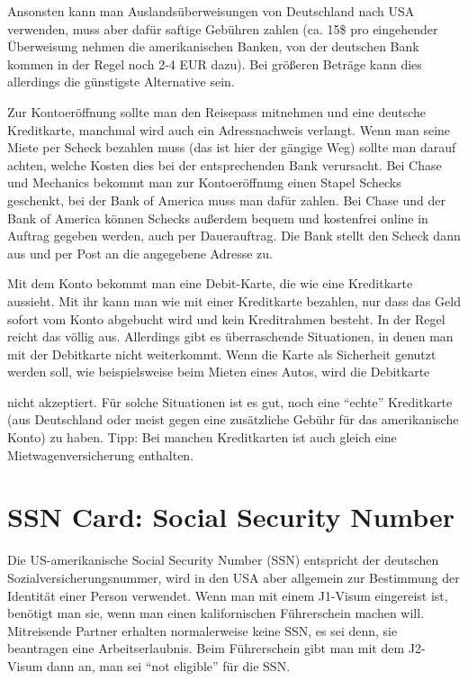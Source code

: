 \documentclass[a4paper]{scrreprt}
\begin{document}
Ansonsten kann man Auslandsüberweisungen von Deutschland nach USA verwenden, muss aber dafür saftige Gebühren zahlen (ca. 15\$ pro eingehender Überweisung nehmen die amerikanischen Banken, von der deutschen Bank kommen in der Regel noch 2-4 EUR dazu). Bei größeren Beträge kann dies allerdings die günstigste Alternative sein.

Zur Kontoeröffnung sollte man den Reisepass mitnehmen und eine deutsche Kreditkarte, manchmal wird auch ein Adressnachweis verlangt. Wenn man seine Miete per Scheck bezahlen muss (das ist hier der gängige Weg) sollte man darauf achten, welche Kosten dies bei der entsprechenden Bank verursacht. Bei Chase und Mechanics bekommt man zur Kontoeröffnung einen Stapel Schecks geschenkt, bei der Bank of America muss man dafür zahlen. Bei Chase und der Bank of America können Schecks außerdem bequem und kostenfrei online in Auftrag gegeben werden, auch per Dauerauftrag. Die Bank stellt den Scheck dann aus und per Post an die angegebene Adresse zu.

Mit dem Konto bekommt man eine Debit-Karte, die wie eine Kreditkarte aussieht. Mit ihr kann man wie mit einer Kreditkarte bezahlen, nur dass das Geld sofort vom Konto abgebucht wird und kein Kreditrahmen besteht. In der Regel reicht das völlig aus. Allerdings gibt es überraschende Situationen, in denen man mit der Debitkarte nicht weiterkommt. Wenn die Karte als Sicherheit genutzt werden soll, wie beispielsweise beim Mieten eines Autos, wird die Debitkarte
 
nicht akzeptiert. Für solche Situationen ist es gut, noch eine "`echte"' Kreditkarte (aus Deutschland oder meist gegen eine zusätzliche Gebühr für das amerikanische Konto) zu haben. Tipp: Bei manchen Kreditkarten ist auch gleich eine Mietwagenversicherung enthalten.


\section{SSN Card: Social Security Number}

Die US-amerikanische Social Security Number (SSN) entspricht der deutschen Sozialversicherungsnummer, wird in den USA aber allgemein zur Bestimmung der Identität einer Person verwendet. Wenn man mit einem J1-Visum eingereist ist, benötigt man sie, wenn man einen kalifornischen Führerschein machen will. Mitreisende Partner erhalten normalerweise keine SSN, es sei denn, sie beantragen eine Arbeitserlaubnis. Beim Führerschein gibt man mit dem J2- Visum dann an, man sei "`not eligible"' für die SSN.
\end{document}
